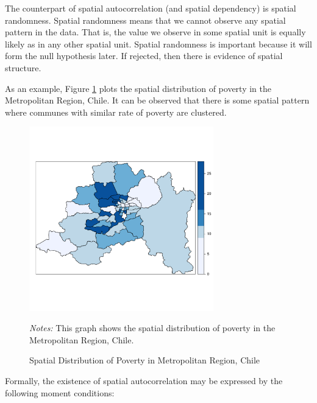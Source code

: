 \documentclass[english,12pt]{book}\usepackage[]{graphicx}\usepackage[]{xcolor}
\newenvironment{knitrout}{}{} %
\begin{document}
The counterpart of spatial autocorrelation (and spatial dependency) is spatial randomness.  Spatial randomness means that we cannot observe any spatial pattern in the data. That is, the value we observe in some spatial unit is equally likely as in any other spatial unit. Spatial randomness is important because it will form the null hypothesis later. If rejected, then there is evidence of spatial structure.  

As an example, Figure \ref{fig:MR} plots the spatial distribution of poverty in the Metropolitan Region, Chile. It can be observed that there is some spatial pattern where communes with similar rate of poverty are clustered. 

\begin{figure}[ht]
  \caption{Spatial Distribution of Poverty in Metropolitan Region, Chile}
    \label{fig:MR}
    \centering
    	\begin{minipage}{.9\linewidth}
\begin{knitrout}
\color{fgcolor}

{\centering \includegraphics[width=8cm,height=8cm]{figure/MetroRegion-1} 

}


\end{knitrout}
\footnotesize
		\emph{Notes:} This graph shows the spatial distribution of poverty in the Metropolitan Region, Chile. 
	\end{minipage}	
\end{figure}

Formally, the existence of spatial autocorrelation may be expressed by the following moment conditions:
\end{document}
